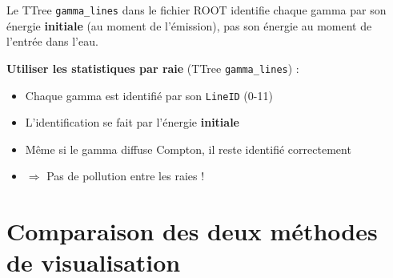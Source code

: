 \documentclass[11pt,a4paper]{article}
\begin{document}
Le TTree \texttt{gamma\_lines} dans le fichier ROOT identifie chaque gamma par son énergie \textbf{initiale} (au moment de l'émission), pas son énergie au moment de l'entrée dans l'eau.

\begin{tcolorbox}[colback=green!5!white, colframe=green!75!black, title=\textbf{Solution recommandée}]
\textbf{Utiliser les statistiques par raie} (TTree \texttt{gamma\_lines}) :
\begin{itemize}
    \item Chaque gamma est identifié par son \texttt{LineID} (0-11)
    \item L'identification se fait par l'énergie \textbf{initiale}
    \item Même si le gamma diffuse Compton, il reste identifié correctement
    \item $\Rightarrow$ Pas de pollution entre les raies !
\end{itemize}
\end{tcolorbox}

\section{Comparaison des deux méthodes de visualisation}
\end{document}
